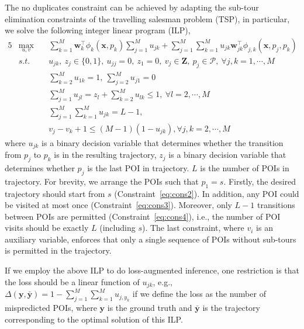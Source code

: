The no duplicates constraint can be achieved by adapting the sub-tour elimination constraints of the travelling salesman problem (TSP),
in particular, we solve the following integer linear program (ILP),
\begin{alignat}{5}
& \max_{u,v} ~&& \sum_{k=1}^M \mathbf{w}_k^\top \phi_k(\mathbf{x}, p_k) \sum_{j=1}^M u_{jk} + 
                 \sum_{j=1}^M \sum_{k=1}^M u_{jk} \mathbf{w}_{jk}^\top \phi_{j, k}(\mathbf{x}, p_j, p_k) \\
& s.t. ~~ ~&& u_{jk}, ~z_j \in \{0, 1\}, ~u_{jj}=0, ~z_1=0, ~v_j \in \mathbf{Z},~ p_j \in \mathcal{P}, ~\forall j, k = 1,\cdots,M   \label{eq:cons1} \\
&          && \sum_{k=2}^M u_{1k} = 1, ~\sum_{j=2}^M u_{j1} = 0  \label{eq:cons2} \\
&          && \sum_{j=1}^M u_{jl} = z_l + \sum_{k=2}^M u_{lk} \le 1,   ~\forall l=2,\cdots,M                    \label{eq:cons3} \\
&          && \sum_{j=1}^M \sum_{k=1}^M u_{jk} = L-1,                                                           \label{eq:cons4} \\
&          && v_j - v_k + 1 \le (M-1) (1-u_{jk}),                     \forall j,k=2,\cdots,M                    \label{eq:cons5}
\end{alignat}
where $u_{jk}$ is a binary decision variable that determines whether the transition from $p_j$ to $p_k$ is in the resulting trajectory,
$z_j$ is a binary decision variable that determines whether $p_j$ is the last POI in trajectory.
$L$ is the number of POIs in trajectory.
For brevity, we arrange the POIs such that $p_1 = s$.
Firstly, the desired trajectory should start from $s$ (Constraint~\ref{eq:cons2}).
In addition, any POI could be visited at most once (Constraint~\ref{eq:cons3}).
Moreover, only $L-1$ transitions between POIs are permitted (Constraint~\ref{eq:cons4}),
i.e., the number of POI visits should be exactly $L$ (including $s$).
The last constraint, where $v_i$ is an auxiliary variable,
enforces that only a single sequence of POIs without sub-tours is permitted in the trajectory.

If we employ the above ILP to do loss-augmented inference, one restriction is that the loss should be a linear function of $u_{jk}$,
e.g., $\Delta(\mathbf{y}, \bar{\mathbf{y}}) = 1 - \sum_{j=1}^M \sum_{k=1}^M u_{j, y_k}$ if we define the loss as the number of mispredicted POIs,
where $\mathbf{y}$ is the ground truth and $\bar{\mathbf{y}}$ is the trajectory corresponding to the optimal solution of this ILP.


